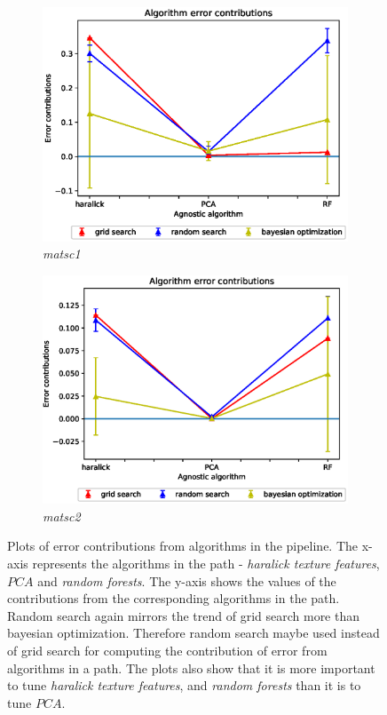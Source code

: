 \begin{figure}[ht!]
\begin{subfigure}{.5\textwidth}
\end{subfigure}
\begin{subfigure}{.5\textwidth}
  \centering
  \includegraphics[scale=0.37]{img/EP/agnostic_error_alg_matsc_dataset1.eps}
  \caption{\textit{matsc1}}
  \label{fig:eq_alg_matsc1}
\end{subfigure}%
\begin{subfigure}{.5\textwidth}
  \centering
  \includegraphics[scale=0.37]{img/EP/agnostic_error_alg_matsc_dataset2.eps}
  \caption{\textit{matsc2}}
  \label{fig:eq_alg_matsc2}
\end{subfigure}

\caption{Plots of error contributions from algorithms in the pipeline. The x-axis represents the algorithms in the path - \textit{haralick texture features}, $PCA$ and \textit{random forests}. The y-axis shows the values of the contributions from the corresponding algorithms in the path. Random search again mirrors the trend of grid search more than bayesian optimization. Therefore random search maybe used instead of grid search for computing the contribution of error from algorithms in a path. The plots also show that it is more important to tune \textit{haralick texture features}, and \textit{random forests} than it is to tune  $PCA$. }
\label{fig:eq_alg}
\end{figure}
